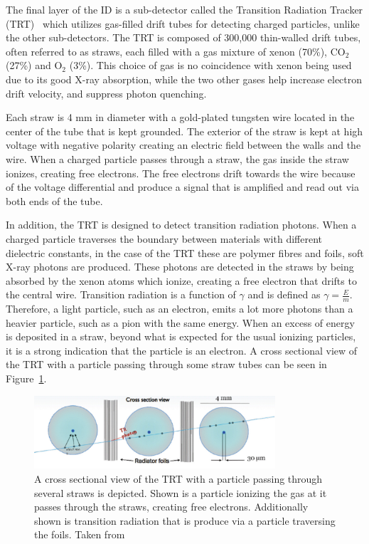 The final layer of the ID is a sub-detector called the Transition Radiation Tracker (TRT)~\cite{atlas_trt} which utilizes gas-filled drift tubes for detecting charged particles, unlike the other sub-detectors. The TRT is composed of 300,000 thin-walled drift tubes, often referred to as straws, each filled with a gas mixture of xenon (70\%), $\mathrm{CO}_2$ (27\%) and $\mathrm{O}_2$ (3\%). This choice of gas is no coincidence with xenon being used due to its good X-ray absorption, while the two other gases help increase electron drift velocity, and suppress photon quenching. 

Each straw is 4 mm in diameter with a gold-plated tungsten wire located in the center of the tube that is kept grounded. The exterior of the straw is kept at high voltage with negative polarity creating an electric field between the walls and the wire. When a charged particle passes through a straw, the gas inside the straw ionizes, creating free electrons. The free electrons drift towards the wire because of the voltage differential and produce a signal that is amplified and read out via both ends of the tube.

In addition, the TRT is designed to detect transition radiation photons. When a charged particle traverses the boundary between materials with different dielectric constants, in the case of the TRT these are polymer fibres and foils, soft X-ray photons are produced. These photons are detected in the straws by being absorbed by the xenon atoms which ionize, creating a free electron that drifts to the central wire. Transition radiation is a function of $\gamma$ and is defined as $\gamma = \frac{E}{m}$. Therefore, a light particle, such as an electron, emits a lot more photons than a heavier particle, such as a pion with the same energy. When an excess of energy is deposited in a straw, beyond what is expected for the usual ionizing particles, it is a strong indication that the particle is an electron.
A cross sectional view of the TRT with a particle passing through some straw tubes can be seen in Figure~\ref{fig:atlas_trt_straw_hits}.

\begin{figure}
    \centering
    \includegraphics[width=0.8\textwidth]{figures/atlas/atlas_trt_tubes.png}
    \caption{A cross sectional view of the TRT with a particle passing through several straws is depicted. Shown is a particle ionizing the gas at it passes through the straws, creating free electrons. Additionally shown is transition radiation
    that is produce via a particle traversing the foils. Taken from~\cite{atlas_trt}}\label{fig:atlas_trt_straw_hits}
\end{figure}

